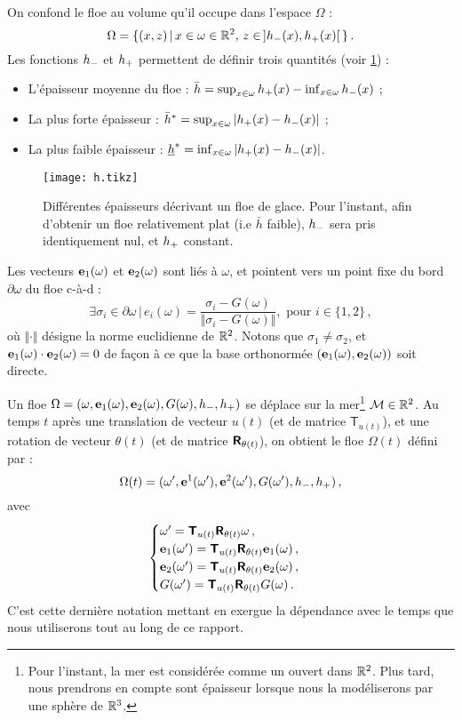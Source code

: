 \noindent On confond le floe au volume qu'il occupe dans l'espace $\Omega$ :
\[
    \Omega = \{(x,z) \,|\, x \in \omega \in \mathbb{R}^2, \, z \in \,]h_{-}(x), h_{+}(x)[ \, \} \,.
\] 
Les fonctions $h_{-}$ et $h_{+}$ permettent de définir trois quantités (voir \cref{fig:h}) :
\begin{itemize}
    \item L'épaisseur moyenne du floe : $\bar{h} =  \sup_{x\in\omega}{h_{+}(x)} - \inf_{x\in\omega}{h_{-}(x)}$ ;
    \item La plus forte épaisseur : $\bar{h}^* = \sup_{x\in\omega}{ \vert h_{+}(x) - h_{-}(x) \vert}$ ;
    \item La plus faible épaisseur : $\underline{h}^* = \inf_{x\in\omega}{ \vert h_{+}(x) - h_{-}(x) \vert}$. 
\end{itemize}

\begin{figure}[!ht]
    \centering
    \texttt{[image: h.tikz]}
    \caption{Différentes épaisseurs décrivant un floe de glace. Pour l'instant, afin d'obtenir un floe relativement plat (i.e $\bar{h}$ faible), $h_{-}$ sera pris identiquement nul, et $h_{+}$ constant.}
    \label{fig:h}
\end{figure}

\noindent Les vecteurs $\bm{\mathrm{e}}_1(\omega)$ et $\bm{\mathrm{e}}_2(\omega)$ sont liés à $\omega$, et pointent vers un point fixe du bord $\partial \omega$ du floe c-à-d :
\[
    \exists \sigma_i \in \partial \omega \, | \, e_i(\omega) = \frac{\sigma_i - G(\omega)}{\Vert \sigma_i - G(\omega) \Vert}, \text{ pour } i \in \{1,2\} \,,
\]
où $\Vert \cdot \Vert$ désigne la norme euclidienne de $\mathbb{R}^2$. Notons que $\sigma_1 \neq \sigma_2$, et $\bm{\mathrm{e}}_1(\omega) \cdot \bm{\mathrm{e}}_2(\omega) = 0$ de façon à ce que la base orthonormée $(\bm{\mathrm{e}}_1(\omega), \bm{\mathrm{e}}_2(\omega))$ soit directe.

Un floe $\Omega = (\omega, \bm{\mathrm{e}}_1(\omega), \bm{\mathrm{e}}_2(\omega), G(\omega), h_{-}, h_{+})$ se déplace sur la mer\footnote{Pour l'instant, la mer est considérée comme un ouvert dans $\mathbb{R}^2$. Plus tard, nous prendrons en compte sont épaisseur lorsque nous la modéliserons par une sphère de $\mathbb{R}^3$.} $\mathcal{M} \in \mathbb{R}^2$. Au temps $t$ après une translation de vecteur $u(t)$ (et de matrice $\mathsf{T}_{u(t)}$), et une rotation de vecteur $\theta(t)$ (et de matrice $\bm{\mathsf{R}}_{\theta(t)}$), on obtient le floe $\Omega (t)$ défini par :
\[
    \Omega (t) = (\omega^\prime, \bm{\mathrm{e}}^1(\omega^\prime), \bm{\mathrm{e}}^2(\omega^\prime), G(\omega^\prime), h_{-}, h_{+}) \,,
\]
avec
$$ 
\begin{cases}
    \omega^\prime = \bm{\mathsf{T}}_{u(t)} \bm{\mathsf{R}}_{\theta(t)} \omega \,, \\
    \bm{\mathrm{e}}_1(\omega^\prime) = \bm{\mathsf{T}}_{u(t)} \bm{\mathsf{R}}_{\theta(t)} \bm{\mathrm{e}}_1(\omega) \,, \\
    \bm{\mathrm{e}}_2(\omega^\prime) = \bm{\mathsf{T}}_{u(t)} \bm{\mathsf{R}}_{\theta(t)} \bm{\mathrm{e}}_2(\omega) \,, \\
    G(\omega^\prime) = \bm{\mathsf{T}}_{u(t)} \bm{\mathsf{R}}_{\theta(t)} G(\omega) \,.
\end{cases}
$$
C'est cette dernière notation mettant en exergue la dépendance avec le temps que nous utiliserons tout au long de ce rapport.

